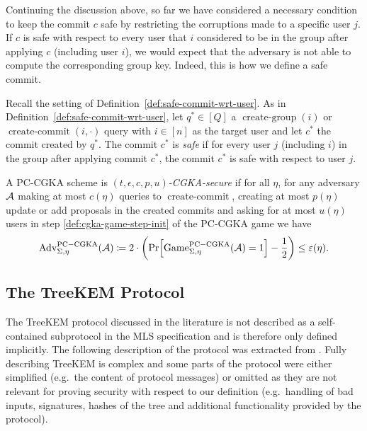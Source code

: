 
Continuing the discussion above, so far we have considered a necessary condition to keep the commit $c$ safe by restricting the corruptions made to a specific user $j$. If $c$ is safe with respect to every user that $i$ considered to be in the group after applying $c$ (including user $i$), we would expect that the adversary is not able to compute the corresponding group key. Indeed, this is how we define a safe commit.

\begin{definition} \label{def:safe-commit}
	Recall the setting of Definition~\ref{def:safe-commit-wrt-user}. As in Definition~\ref{def:safe-commit-wrt-user}, let $q^* \in [Q]$ a $\operatorname{create-group}(i)$ or $\operatorname{create-commit}(i, \cdot)$ query with $i \in [n]$ as the target user and let $c^*$ the commit created by $q^*$. The commit $c^*$ is \emph{safe} if for every user $j$ (including $i$) in the group after applying commit $c^*$, the commit $c^*$ is safe with respect to user $j$.
\end{definition}

\begin{definition}
	A PC-CGKA scheme is \emph{$(t, \epsilon, c, p, u)$-CGKA-secure} if for all $\eta$, for any adversary $\mathcal{A}$ making at most $c(\eta)$ queries to $\operatorname{create-commit}$, creating at most $p(\eta)$ update or add proposals in the created commits and asking for at most $u(\eta)$ users in step \ref{def:cgka-game-step-init} of the PC-CGKA game we have
	\begin{align*}
		\advantage{\Sigma}{\eta}{PC-CGKA}(\adv) \coloneqq 2 \cdot \left(\pr{\game{\Sigma}{\eta}{PC-CGKA}(\adv) = 1} - \frac{1}{2}\right) \le \epsilon(\eta).
	\end{align*}
\end{definition}

\subsection{The TreeKEM Protocol}

The TreeKEM protocol discussed in the literature is not described as a self-contained subprotocol in the MLS specification \cite{rfc9420} and is therefore only defined implicitly. The following description of the protocol was extracted from \cite{rfc9420}. Fully describing TreeKEM is complex and some parts of the protocol were either simplified (e.g.\ the content of protocol messages) or omitted as they are not relevant for proving security with respect to our definition (e.g.\ handling of bad inputs, signatures, hashes of the tree and additional functionality provided by the protocol).

